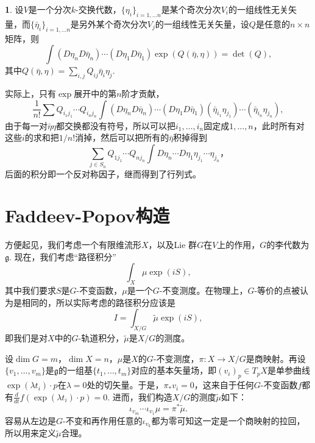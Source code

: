 \documentclass[11pt]{article}
\theoremstyle{definition}
\newtheorem{para}{}[section]
\theoremstyle{plain}
\begin{document}
\begin{para}
    设$V$是一个分次$k$-交换代数，$\{\eta_i\}_{i=1,\dots n}$是某个奇次分次$V_i$的一组线性无关矢量，而$\{\bar \eta_i\}_{i=1,\dots n}$是另外某个奇次分次$V_j$的一组线性无关矢量，设$Q$是任意的$n\times n$矩阵，则
    \[
        \int (D\eta_nD\bar\eta_n)\cdots (D\eta_1D\bar\eta_1) \exp\left(Q(\bar\eta,\eta)\right)=\det(Q),
    \]
    其中$Q(\bar\eta,\eta)=\sum_{i,j}Q_{ij}\bar\eta_i\eta_j$.
\end{para}

实际上，只有$\exp$展开中的第$n$阶才贡献，
\[
    \frac{1}{n!}\sum Q_{i_1j_1}\cdots Q_{i_nj_n}\int (D\eta_nD\bar\eta_n)\cdots (D\eta_1D\bar\eta_1) (\bar\eta_{i_1}\eta_{j_1})\cdots (\bar\eta_{i_n}\eta_{j_n}),
\]
由于每一对$\bar\eta\eta$都交换都没有符号，所以可以把$i_1,\dots,i_n$固定成$1,\dots,n$，此时所有对这些$i$的求和把$1/n!$消掉，然后可以把所有的$\bar\eta$积掉得到
\[
    \sum_{j\in S_n} Q_{1j_1}\cdots Q_{nj_n}\int D\eta_n\cdots D\eta_1 \eta_{j_1}\cdots \eta_{j_n}，
\]
后面的积分即一个反对称因子，继而得到了行列式。

\section{Faddeev-Popov构造}

方便起见，我们考虑一个有限维流形$X$，以及Lie 群$G$在$V$上的作用，$G$的李代数为$\mathfrak g$. 现在，我们考虑“路径积分”
\[
\int_{X} \mu \exp(iS),
\]
其中我们要求$S$是$G$-不变函数，$\mu$是一个$G$-不变测度。在物理上，$G$-等价的点被认为是相同的，所以实际考虑的路径积分应该是
\[
I=\int_{X/G}\tilde \mu\exp(iS),
\]
即我们是对$X$中的$G$-轨道积分，$\tilde \mu$是$X/G$的测度。

设$\dim G=m$，$\dim X=n$，$\mu$是$X$的$G$-不变测度，$\pi:X\to X/G$是商映射。再设$\{v_1,\dots,v_{m}\}$是$\mathfrak g$的一组基$\{t_1,\dots,t_{m}\}$对应的基本矢量场，即$(v_i)_p\in T_p X$是单参曲线$\exp(\lambda t_i)\cdot p$在$\lambda=0$处的切矢量。于是，$\pi_* v_i=0$，这来自于任何$G$-不变函数$f$都有$\frac{d}{dt}f(\exp(\lambda t_i)\cdot p)=0$. 进而，我们构造$X/G$的测度$\tilde \mu$如下：
\[
    \iota_{v_m}\cdots \iota_{v_1}\mu=\pi^*\tilde \mu.
\]
容易从左边是$G$-不变和再作用任意的$\iota_{v_k}$都为零可知这一定是一个商映射的拉回，所以用来定义$\tilde \mu$合理。
\end{document}
